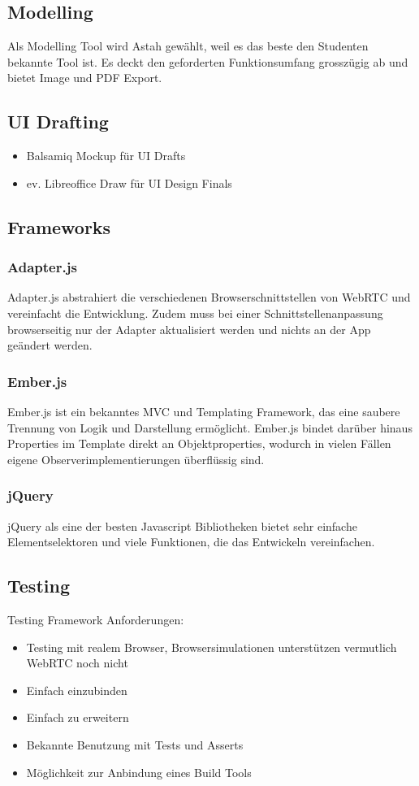 \subsection{Modelling}
Als Modelling Tool wird Astah gewählt, weil es das beste den Studenten bekannte Tool ist.
Es deckt den geforderten Funktionsumfang grosszügig ab und bietet Image und PDF Export.

\subsection{UI Drafting}
\begin{itemize}
	\setlength{\itemsep}{-\parsep}
	\item Balsamiq Mockup für UI Drafts
	\item ev. Libreoffice Draw für UI Design Finals
\end{itemize}


\subsection{Frameworks}
\subsubsection{Adapter.js}
Adapter.js abstrahiert die verschiedenen Browserschnittstellen von WebRTC und vereinfacht die Entwicklung. Zudem muss bei einer Schnittstellenanpassung browserseitig nur der Adapter aktualisiert werden und nichts an der App geändert werden.

\subsubsection{Ember.js}
Ember.js ist ein bekanntes MVC und Templating Framework, das eine saubere Trennung von Logik und Darstellung ermöglicht. Ember.js bindet darüber hinaus Properties im Template direkt an Objektproperties, wodurch in vielen Fällen eigene Observerimplementierungen überflüssig sind.

\subsubsection{jQuery}
jQuery als eine der besten Javascript Bibliotheken bietet sehr einfache Elementselektoren und viele Funktionen, die das Entwickeln vereinfachen.


\subsection{Testing}
Testing Framework Anforderungen:
\begin{itemize}
	\setlength{\itemsep}{-\parsep}
	\item Testing mit realem Browser, Browsersimulationen unterstützen vermutlich WebRTC noch nicht
	\item Einfach einzubinden
	\item Einfach zu erweitern
	\item Bekannte Benutzung mit Tests und Asserts
	\item Möglichkeit zur Anbindung eines Build Tools
\end{itemize}

